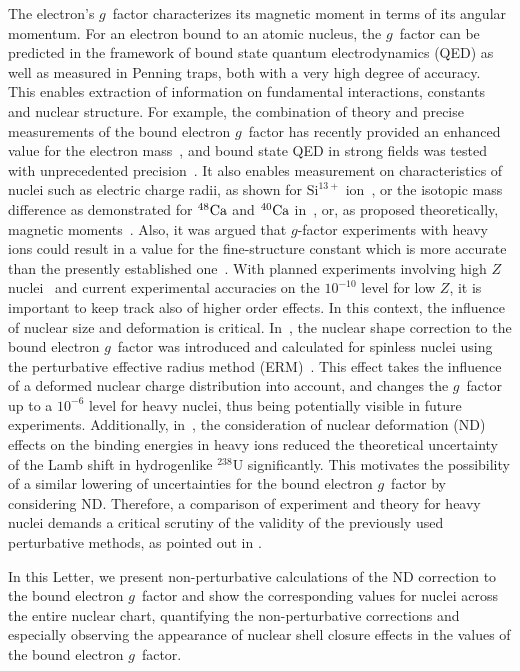 The electron's $g$~factor characterizes its magnetic moment in terms of its angular momentum. For an electron bound to an atomic nucleus, the $g$~factor can be predicted in the framework of bound state quantum electrodynamics (QED) as well as measured in Penning traps, both with a very high degree of accuracy. This enables extraction of information on fundamental interactions, constants and nuclear structure. For example, the combination of theory and precise measurements of the bound electron $g$~factor has recently provided an enhanced value for the electron mass~\cite{Sturm2014}, and bound state QED in strong fields was tested with unprecedented precision~\cite{Haffner2000, Verdu2004, Kohler2015, Zatorski2017}. It also enables measurement on characteristics of nuclei such as electric charge radii, as shown for $\textrm{Si}^{13+}$ ion~\cite{Sturm2011}, or the isotopic mass difference as demonstrated for $\null^{48} \textrm{Ca}$ and $\null^{40} \textrm{Ca}$ in~\cite{Kohler2016}, or, as proposed theoretically, magnetic moments~\cite{Yerokhin2011}.  Also, it was argued that $g$-factor experiments with heavy ions could result in a value for the fine-structure constant which is more accurate than the presently established one~\cite{Shabaev2006}.
With planned experiments involving high $Z$ nuclei~\cite{HITRAP2008,vogel2015} and current experimental accuracies on the $10^{-10}$ level for low $Z$, it is important to keep track also of higher order effects. In this context, the influence of nuclear size and deformation is critical.
In~\cite{jacek2012}, the nuclear shape correction to the bound electron $g$~factor was introduced and calculated for spinless nuclei using the perturbative effective radius method (ERM)~\cite{Shabaev1993,kozhedub2008}. This effect takes the influence of a deformed nuclear charge distribution into account, and changes the $g$~factor up to a $10^{-6}$ level for heavy nuclei, thus being potentially visible in future experiments.
Additionally, in~\cite{kozhedub2008}, the consideration of nuclear deformation (ND) effects on the binding energies in heavy ions reduced the theoretical uncertainty of the Lamb shift in hydrogenlike $^{238}$U significantly. This motivates the possibility of a similar lowering of uncertainties for the bound electron $g$~factor by considering ND.
Therefore, a comparison of experiment and theory for heavy nuclei demands a critical scrutiny of the validity of the previously used perturbative methods, as pointed out in \cite{karshenboim2018}.

In this Letter, we present non-perturbative calculations of the ND correction to the bound electron $g$~factor and show the corresponding values for nuclei across the entire nuclear chart, quantifying the non-perturbative corrections and especially observing the appearance of nuclear shell closure effects in the values of the bound electron $g$~factor.

